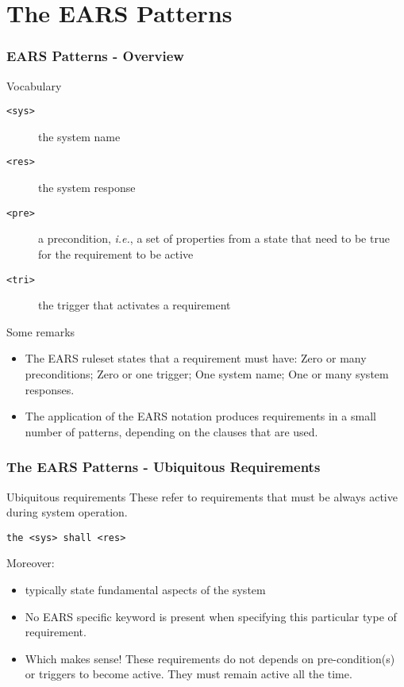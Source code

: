 \documentclass[aspectratio=169]{beamer}
\begin{document}
\section*{The EARS Patterns}
%
%
%
\begin{frame}
  \frametitle{EARS Patterns - Overview}
  \begin{block}{Vocabulary}
    \small
    \begin{description}
      \item [\texttt{<sys>}] the system name
      \item [\texttt{<res>}] the system response
      \item [\texttt{<pre>}] a precondition, {\em i.e.}, a set of properties from a state that need to be true for the requirement to be active
      \item [\texttt{<tri>}] the trigger that activates a requirement
    \end{description}
  \end{block}
  \begin{block}{Some remarks}
  \small
    \begin{itemize}
      \item   The EARS ruleset states that a requirement must have: Zero or many preconditions; Zero or one trigger; One system name; One or many system responses.
      \item The application of the EARS notation produces requirements in a small number of patterns, depending on the clauses that are used.
    \end{itemize}
  \end{block}
\end{frame}
%
\begin{frame}[fragile]
  \frametitle{The EARS Patterns - Ubiquitous Requirements}
  \begin{block}{Ubiquitous requirements}
    These refer to requirements that must be always active during system operation. 
    \begin{lstlisting}[language=EARS]
                      the <sys> shall <res>
    \end{lstlisting}
    Moreover:
    \begin{itemize}
    \item typically state fundamental aspects of the system
    \item No EARS specific keyword is present when specifying this particular type of requirement.
    \item Which makes sense! These requirements do not depends on pre-condition(s) or triggers to become active. They must remain active all the time.
    \end{itemize}
  \end{block}
\end{frame}
\end{document}
